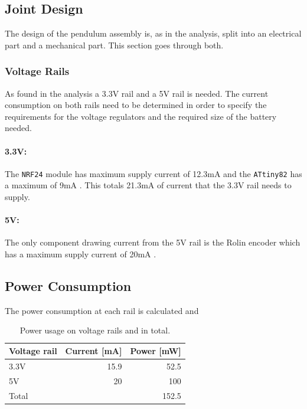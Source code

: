 \subsection{Joint Design} %
\label{sub:joint_design}
The design of the pendulum assembly is, as in the analysis, split into an electrical part and a mechanical part.
This section goes through both.

\subsubsection{Voltage Rails}
\label{subs:voltage_rail}
As found in the analysis a 3.3V rail and a 5V rail is needed. 
The current consumption on both rails need to be determined in order to specify the requirements for the voltage regulators and the required size of the battery needed.


\paragraph{3.3V:}
\label{par:3_3v}
The \texttt{NRF24} module has maximum supply current of 12.3mA \cite{NFR24L01} and the \texttt{ATtiny82} has a maximum of 9mA \cite{attiny84}.
This totals 21.3mA of current that the 3.3V rail needs to supply.

\paragraph{5V:}
\label{par:5v}
The only component drawing current from the 5V rail is the Rolin encoder which has a maximum supply current of 20mA \cite{RLBD01}.

\subsection{Power Consumption} 
\label{subsub:power_consumption}
The power consumption at each rail is calculated and 

\begin{table}
	\centering
	\begin{tabular}{l|r|r}
		 Voltage rail 	& Current [mA] 	& Power [mW]\\
		 \hline
		 3.3V 			& 15.9			&52.5		\\
		 5V  			& 20 			&100		\\
		 \hline
		 Total 			& 				&152.5		
	\end{tabular}
	\caption{Power usage on voltage rails and in total.}
	\label{tab:power_joint}
\end{table}

